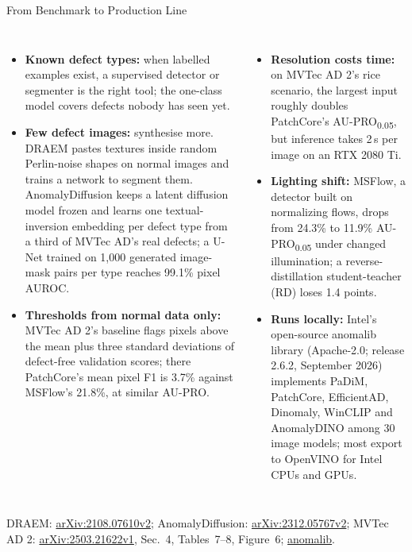 \begin{frame}{From Benchmark to Production Line}
  \begin{columns}[T,onlytextwidth]
      \begin{itemize}\footnotesize\itemsep0.3em
        \item \textbf{Known defect types:} when labelled examples exist, a supervised detector or segmenter is the right tool; the one-class model covers defects nobody has seen yet.
        \item \textbf{Few defect images:} synthesise more. DRAEM pastes textures inside random Perlin-noise shapes on normal images and trains a network to segment them. AnomalyDiffusion keeps a latent diffusion model frozen and learns one textual-inversion embedding per defect type from a third of MVTec AD's real defects; a U-Net trained on 1,000 generated image-mask pairs per type reaches 99.1\% pixel AUROC.
        \item \textbf{Thresholds from normal data only:} MVTec AD 2's baseline flags pixels above the mean plus three standard deviations of defect-free validation scores; there PatchCore's mean pixel F1 is 3.7\% against MSFlow's 21.8\%, at similar AU-PRO.
      \end{itemize}
      \begin{itemize}\footnotesize\itemsep0.3em
        \item \textbf{Resolution costs time:} on MVTec AD 2's rice scenario, the largest input roughly doubles PatchCore's AU-PRO\textsubscript{0.05}, but inference takes 2\,s per image on an RTX 2080 Ti.
        \item \textbf{Lighting shift:} MSFlow, a detector built on normalizing flows, drops from 24.3\% to 11.9\% AU-PRO\textsubscript{0.05} under changed illumination; a reverse-distillation student-teacher (RD) loses 1.4 points.
        \item \textbf{Runs locally:} Intel's open-source anomalib library (Apache-2.0; release 2.6.2, September 2026) implements PaDiM, PatchCore, EfficientAD, Dinomaly, WinCLIP and AnomalyDINO among 30 image models; most export to OpenVINO for Intel CPUs and GPUs.
      \end{itemize}
  \end{columns}
  {\scriptsize DRAEM: \href{https://arxiv.org/abs/2108.07610v2}{arXiv:2108.07610v2}; AnomalyDiffusion: \href{https://arxiv.org/abs/2312.05767v2}{arXiv:2312.05767v2}; MVTec AD 2: \href{https://arxiv.org/abs/2503.21622v1}{arXiv:2503.21622v1}, Sec.~4, Tables~7--8, Figure~6; \href{https://github.com/open-edge-platform/anomalib}{anomalib}.\par}
\end{frame}
